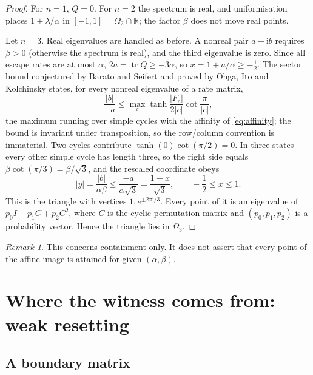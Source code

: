 \documentclass[11pt,a4paper]{article}
\numberwithin{equation}{section}
\theoremstyle{definition}
\theoremstyle{remark}
\newtheorem{remark}[theorem]{Remark}
\newcommand{\ii}{\mathrm{i}}
\newcommand{\Om}{\Omega}
\newcommand{\tr}{\operatorname{tr}}
\begin{document}
\begin{proof}
For \(n=1\), \(Q=0\). For \(n=2\) the spectrum is real, and
uniformisation places \(1+\lambda/\alpha\) in \([-1,1]=\Om_2\cap\mathbb
R\); the factor \(\beta\) does not move real points.

Let \(n=3\). Real eigenvalues are handled as before. A nonreal pair
\(a\pm\ii b\) requires \(\beta>0\) (otherwise the spectrum is real), and
the third eigenvalue is zero. Since all escape rates are at most
\(\alpha\), \(2a=\tr Q\geq-3\alpha\), so \(x=1+a/\alpha\ge-\frac12\).
The sector bound conjectured by Barato and Seifert \cite{barato2017}
and proved by Ohga, Ito and Kolchinsky \cite[Eq.~(10)]{ohga2023} states,
for every nonreal eigenvalue of a rate matrix,
\begin{equation}
\frac{|b|}{-a}
\leq\max_c \tanh\frac{|F_c|}{2|c|}\cot\frac{\pi}{|c|},
\label{eq:sector}
\end{equation}
the maximum running over simple cycles with the affinity of
\eqref{eq:affinity}; the bound is invariant under transposition, so the
row/column convention is immaterial. Two-cycles contribute
\(\tanh(0)\cot(\pi/2)=0\). In three states every other simple cycle has
length three, so the right side equals \(\beta\cot(\pi/3)=\beta/\sqrt3\),
and the rescaled coordinate obeys
\begin{equation}
|y|=\frac{|b|}{\alpha\beta}\leq\frac{-a}{\alpha\sqrt3}
=\frac{1-x}{\sqrt3},\qquad -\frac12\leq x\leq1.
\label{eq:triangle}
\end{equation}
This is the triangle with vertices \(1,e^{\pm2\pi\ii/3}\). Every point of
it is an eigenvalue of \(p_0I+p_1C+p_2C^2\), where \(C\) is the cyclic
permutation matrix and \((p_0,p_1,p_2)\) is a probability vector. Hence
the triangle lies in \(\Om_3\).
\end{proof}

\begin{remark}
This concerns containment only. It does not assert that every point of
the affine image is attained for given \((\alpha,\beta)\).
\end{remark}

\section{Where the witness comes from: weak resetting}
\label{sec:family}

\subsection{A boundary matrix}
\end{document}
